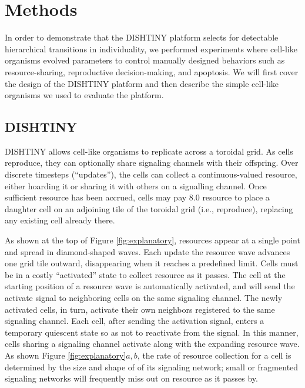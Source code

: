 \section{Methods}

In order to demonstrate that the DISHTINY platform selects for detectable hierarchical transitions in individuality, we performed experiments where cell-like organisms evolved parameters to control manually designed behaviors such as resource-sharing, reproductive decision-making, and apoptosis.
We will first cover the design of the DISHTINY platform and then describe the simple cell-like organisms we used to evaluate the platform.

\subsection{DISHTINY}



DISHTINY allows cell-like organisms to replicate across a toroidal grid.  As cells reproduce, they can optionally share signaling channels with their offspring.
Over discrete timesteps (``updates''), the cells can collect a continuous-valued resource, either hoarding it or sharing it with others on a signalling channel.
Once sufficient resource has been accrued, cells may pay $8.0$ resource to place a daughter cell on an adjoining tile of the toroidal grid (i.e., reproduce), replacing any existing cell already there.

As shown at the top of Figure \ref{fig:explanatory}, resources appear at a single point and spread in diamond-shaped waves.
Each update the resource wave advances one grid tile outward, disappearing when it reaches a predefined limit.
Cells must be in a costly ``activated'' state to collect resource as it passes.
The cell at the starting position of a resource wave is automatically activated, and will send the activate signal to neighboring cells on the same signaling channel. %
The newly activated cells, in turn, activate their own neighbors registered to the same signaling channel.  Each cell, after sending the activation signal, enters a temporary quiescent state so as not to reactivate from the signal.
In this manner, cells sharing a signaling channel activate %
along with the expanding resource wave.
As shown Figure \ref{fig:explanatory}$a,b$, the rate of resource collection for a cell is determined by the size and shape of of its %
signaling network;
small or fragmented %
signaling networks will frequently miss out on resource as it passes by.

